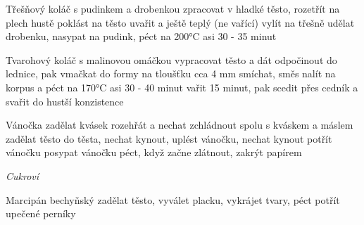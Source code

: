 \documentclass[12pt,a4paper]{article}
\begin{document}
\begin{recipe}{Třešňový koláč s pudinkem a drobenkou}
   zpracovat v hladké těsto, rozetřít na plech
   hustě poklást na těsto
   uvařit a ještě teplý (ne vařící) vylít na třešně
   udělat drobenku, nasypat na pudink, péct na 200°C asi 30 - 35 minut
\end{recipe}
\newpage

\begin{recipe}{Tvarohový koláč s malinovou omáčkou}
   vypracovat těsto a dát odpočinout do lednice, pak vmačkat do formy na tloušťku cca 4 mm
   smíchat, směs nalít na korpus a péct na 170°C asi 30 - 40 minut
   vařit 15 minut, pak scedit přes cedník a svařit do hustší konzistence
\end{recipe}
\newpage

\begin{recipe}{Vánočka}
   zadělat kvásek
   rozehřát a nechat zchládnout
   spolu s kváskem a máslem zadělat těsto
   do těsta, nechat kynout, uplést vánočku, nechat kynout
   potřít vánočku
   posypat vánočku
  \ingredient{} péct, když začne zlátnout, zakrýt papírem
\end{recipe}
\newpage

\vspace*{\fill}
\hfill {\Huge\it Cukroví}\hfill
\vspace*{\fill}
\newpage

\begin{recipe}{Marcipán bechyňský}
   zadělat těsto, vyválet placku, vykrájet tvary, péct
   potřít upečené perníky
\end{recipe}
\newpage
\end{document}
